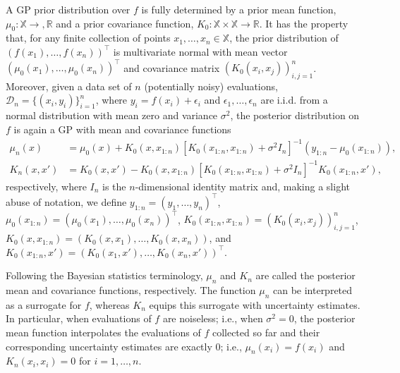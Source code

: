 \documentclass{wscpaperproc}
\newcommand{\R}{\mathbb{R}}
\newcommand{\X}{\mathbb{X}}
\theoremstyle{wsc}
\begin{document}
A GP prior distribution over $f$ is fully determined by a prior mean function, $\mu_0 : \X \rightarrow, \R$ and a prior covariance function, $K_0 : \X \times \X \rightarrow \R$. It has the property that, for any finite collection of points  $x_1,\ldots, x_n \in \X$, the prior distribution of $(f(x_1),\ldots, f(x_n))^{\top}$ is multivariate normal with mean vector $(\mu_0(x_1),\ldots, \mu_0(x_n))^{\top}$ and covariance matrix $(K_0(x_i, x_j))_{i,j=1}^n$. Moreover, given a data set of $n$ (potentially noisy) evaluations, $\mathcal{D}_n = \{(x_i, y_i)\}_{i=1}^n$, where $y_i = f(x_i) + \epsilon_i$ and $\epsilon_1,\ldots, \epsilon_n$ are i.i.d. from a normal distribution with mean zero and variance $\sigma^2$, the posterior distribution on $f$ is again a GP with mean and covariance functions 
\begin{align*}
  \mu_n(x) &= \mu_0(x) + K_0(x, x_{1:n})\left[K_0(x_{1:n}, x_{1:n}) + \sigma^2 I_n\right]^{-1} (y_{1:n} - \mu_0(x_{1:n})),\\
    K_n(x,x') &= K_0( x, x') - K_0(x, x_{1:n})\left[K_0(x_{1:n}, x_{1:n}) + \sigma^2 I_n\right]^{-1}K_0( x_{1:n}, x'),
\end{align*}
respectively, where $I_n$ is the $n$-dimensional identity matrix and, making a slight abuse of notation, we define $y_{1:n} = (y_1,\ldots,y_n)^\top$, $\mu_0(x_{1:n}) = (\mu_{0}(x_1),\ldots, \mu_{0}(x_n))^\top$, $K_0(x_{1:n}, x_{1:n})=(K_0(x_i, x_j))_{i,j=1}^n$, $K_0(x, x_{1:n}) = (K_0(x,x_1), \ldots, K_0(x,x_n))$, and  $K_0(x_{1:n}, x') = (K_0(x_1,x'), \ldots, K_0(x_n, x'))^\top$.

Following the Bayesian statistics terminology, $\mu_n$ and $K_n$ are called the posterior mean and covariance functions, respectively.  The function $\mu_n$ can be interpreted as a surrogate for $f$, whereas $K_n$ equips this surrogate with uncertainty estimates. In particular, when evaluations of $f$ are noiseless; i.e., when $\sigma^2 = 0$, the posterior mean function interpolates the evaluations of $f$ collected so far and their corresponding uncertainty estimates are exactly 0; i.e., $\mu_n(x_i)=f(x_i)$ and $K_n(x_i, x_i)=0$ for $i=1,\ldots, n$.
\end{document}
